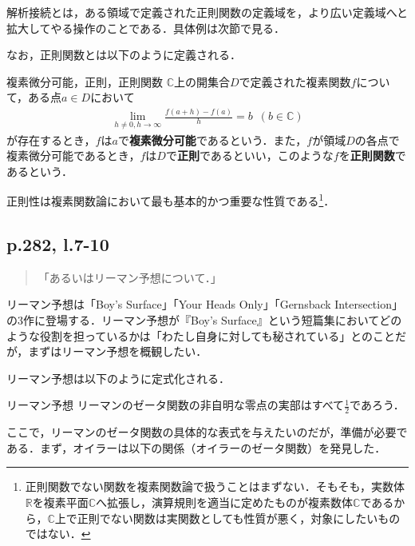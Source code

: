 \documentclass[10pt, a5paper, twoside]{ltjsarticle}
\begin{document}
            解析接続とは，ある領域で定義された正則関数の定義域を，より広い定義域へと拡大してやる操作のことである．具体例は次節で見る．

            なお，正則関数とは以下のように定義される\cite{sugiura1}．

            \begin{dfn}{複素微分可能，正則，正則関数}{}
                $\mathbb{C}$上の開集合$D$で定義された複素関数$f$について，ある点$a \in D$において
                \begin{align*}
                    \lim_{h \neq 0, h \to \infty} \frac{f(a+h) - f(a)}{h} = b \,\,\, (b \in \mathbb{C})
                \end{align*}
                が存在するとき，$f$は$a$で\textbf{複素微分可能}であるという．また，$f$が領域$D$の各点で複素微分可能であるとき，$f$は$D$で\textbf{正則}であるといい，このような$f$を\textbf{正則関数}であるという．
            \end{dfn}

            正則性は複素関数論において最も基本的かつ重要な性質である\footnote{正則関数でない関数を複素関数論で扱うことはまずない．そもそも，実数体$\mathbb{R}$を複素平面$\mathbb{C}$へ拡張し，演算規則を適当に定めたものが複素数体$\mathbb{C}$であるから，$\mathbb{C}$上で正則でない関数は実関数としても性質が悪く，対象にしたいものではない．}．

        \subsection{p.282, l.7-10}

            \begin{quote}
                「あるいはリーマン予想について．」
            \end{quote}

            リーマン予想は「Boy's Surface」「Your Heads Only」「Gernsback Intersection」の3作に登場する．リーマン予想が『Boy's Surface』という短篇集においてどのような役割を担っているかは「わたし自身に対しても秘されている」とのことだが，まずはリーマン予想を概観したい．

            リーマン予想は以下のように定式化される．

            \begin{hyp}{リーマン予想}{}
				リーマンのゼータ関数の非自明な零点の実部はすべて$\displaystyle \frac{1}{2}$であろう．
			\end{hyp}

            ここで，リーマンのゼータ関数の具体的な表式を与えたいのだが，準備が必要である．まず，オイラーは以下の関係（オイラーのゼータ関数）を発見した．
\end{document}
